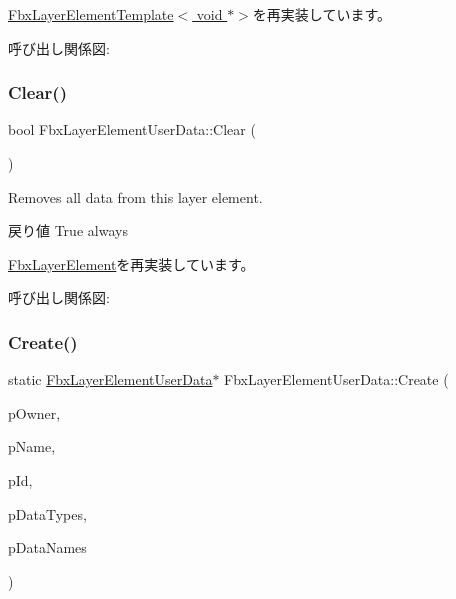 \hyperlink{class_fbx_layer_element_template_aa6d432c5865fcda1b58376119f1fcaa8}{Fbx\+Layer\+Element\+Template$<$ void $\ast$$>$}を再実装しています。

呼び出し関係図\+:
\mbox{\label{class_fbx_layer_element_user_data_aa945631c932f3c811013c903e5ecf55e}} 
\subsubsection{\texorpdfstring{Clear()}{Clear()}}
{\footnotesize\ttfamily bool Fbx\+Layer\+Element\+User\+Data\+::\+Clear (\begin{DoxyParamCaption}{ }\end{DoxyParamCaption})\hspace{0.3cm}{\ttfamily [virtual]}}

Removes all data from this layer element. \begin{DoxyReturn}{戻り値}
{\ttfamily True} always 
\end{DoxyReturn}


\hyperlink{class_fbx_layer_element_a6ab41d0a26802a359efbbc3b2b12dd3d}{Fbx\+Layer\+Element}を再実装しています。

呼び出し関係図\+:
\mbox{\label{class_fbx_layer_element_user_data_ab0a2546165cae14c62143352a32c5dbc}} 
\subsubsection{\texorpdfstring{Create()}{Create()}\hspace{0.1cm}{\footnotesize\ttfamily [1/2]}}
{\footnotesize\ttfamily static \hyperlink{class_fbx_layer_element_user_data}{Fbx\+Layer\+Element\+User\+Data}$\ast$ Fbx\+Layer\+Element\+User\+Data\+::\+Create (\begin{DoxyParamCaption}\item[{\hyperlink{class_fbx_layer_container}{Fbx\+Layer\+Container} $\ast$}]{p\+Owner,  }\item[{const char $\ast$}]{p\+Name,  }\item[{int}]{p\+Id,  }\item[{\hyperlink{class_fbx_array}{Fbx\+Array}$<$ \hyperlink{class_fbx_data_type}{Fbx\+Data\+Type} $>$ \&}]{p\+Data\+Types,  }\item[{\hyperlink{class_fbx_array}{Fbx\+Array}$<$ const char $\ast$$>$ \&}]{p\+Data\+Names }\end{DoxyParamCaption})\hspace{0.3cm}{\ttfamily [static]}}


